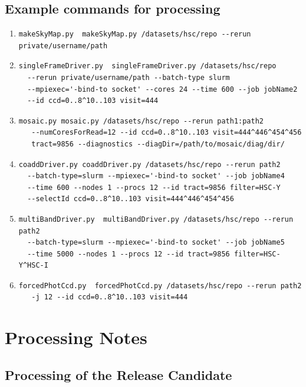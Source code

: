 \documentclass[DM,authoryear,toc]{lsstdoc}
\begin{document}
\subsection{Example commands for processing}
\begin{enumerate}
\item
\begin{verbatim}
makeSkyMap.py  makeSkyMap.py /datasets/hsc/repo --rerun private/username/path
\end{verbatim}
\item
\begin{verbatim}
singleFrameDriver.py  singleFrameDriver.py /datasets/hsc/repo
  --rerun private/username/path --batch-type slurm
  --mpiexec='-bind-to socket' --cores 24 --time 600 --job jobName2
  --id ccd=0..8^10..103 visit=444
\end{verbatim}
\item
\begin{verbatim}
mosaic.py mosaic.py /datasets/hsc/repo --rerun path1:path2
   --numCoresForRead=12 --id ccd=0..8^10..103 visit=444^446^454^456
   tract=9856 --diagnostics --diagDir=/path/to/mosaic/diag/dir/
\end{verbatim}
\item
\begin{verbatim}
coaddDriver.py coaddDriver.py /datasets/hsc/repo --rerun path2
  --batch-type=slurm --mpiexec='-bind-to socket' --job jobName4
  --time 600 --nodes 1 --procs 12 --id tract=9856 filter=HSC-Y
  --selectId ccd=0..8^10..103 visit=444^446^454^456
\end{verbatim}
\item
\begin{verbatim}
multiBandDriver.py  multiBandDriver.py /datasets/hsc/repo --rerun path2
  --batch-type=slurm --mpiexec='-bind-to socket' --job jobName5
  --time 5000 --nodes 1 --procs 12 --id tract=9856 filter=HSC-Y^HSC-I
\end{verbatim}
\item
\begin{verbatim}
forcedPhotCcd.py  forcedPhotCcd.py /datasets/hsc/repo --rerun path2
   -j 12 --id ccd=0..8^10..103 visit=444
\end{verbatim}
\end{enumerate}


\section{Processing Notes}
\subsection{Processing of the Release Candidate}
\end{document}
